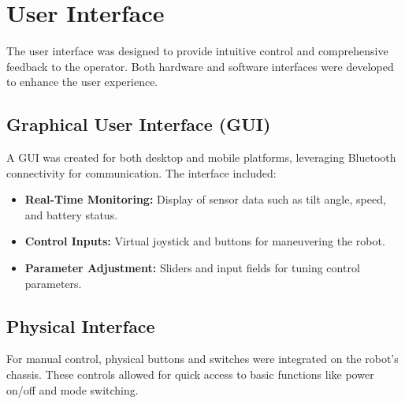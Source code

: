 \section{User Interface}

The user interface was designed to provide intuitive control and comprehensive feedback to the operator. Both hardware and software interfaces were developed to enhance the user experience.

\subsection{Graphical User Interface (GUI)}
A GUI was created for both desktop and mobile platforms, leveraging Bluetooth connectivity for communication. The interface included:

\begin{itemize}
\item \textbf{Real-Time Monitoring:} Display of sensor data such as tilt angle, speed, and battery status.
\item \textbf{Control Inputs:} Virtual joystick and buttons for maneuvering the robot.
\item \textbf{Parameter Adjustment:} Sliders and input fields for tuning control parameters.
\end{itemize}

\subsection{Physical Interface}
For manual control, physical buttons and switches were integrated on the robot's chassis. These controls allowed for quick access to basic functions like power on/off and mode switching.